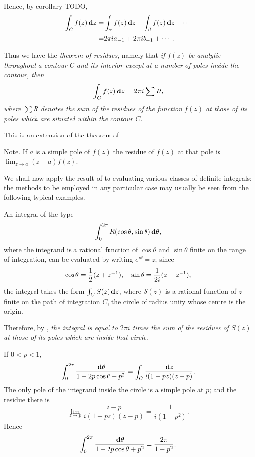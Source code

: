 Hence, by  corollary TODO,
\begin{align*}
  \int_{C} f(z) \, \mathbf{d} z
  =&
  \int_{\alpha} f(z) \, \mathbf{d} z
  + \int_{\beta} f(z) \, \mathbf{d} z
  + \cdots
  \\
  =&
  2\pi i a_{-1} + 2\pi i b_{-1} + \cdots.
\end{align*}

Thus we have the \emph{theorem of residues}, namely that
\emph{if $f(z)$ be analytic throughout a contour $C$ and its interior
  except at a number of poles inside the contour, then
  $$
  \int_{C} f(z) \, \mathbf{d} z = 2\pi i \sum R,
  $$
where $\sum R$ denotes the sum of the residues of the function $f(z)$ at
those of its poles which are situated within the contour $C$.}

This is an extension of the theorem of .

Note. If $a$ is a simple pole of $f(z)$ the residue of $f(z)$ at that pole
is $\lim_{z\rightarrow a} (z-a) f(z)$.


We shall now apply the result of  to evaluating
various classes of definite integrals; the methods to be employed in
any particular case may usually be seen from the following typical
examples.

An integral of the type
$$
\int_{0}^{2\pi} R(\cos \theta, \sin \theta) \dmeasure \theta,\index{Trigonometrical integrals}
$$
where the integrand is a rational function of $\cos\theta$ and
$\sin\theta$ finite on the range of integration, can be evaluated by
writing $e^{i\theta}=z$; since
$$
\cos\theta = \frac{1}{2}(z+z^{-1}),
\quad
\sin\theta = \frac{1}{2i} (z-z^{-1}),
$$
the integral takes the form $\int_{C} S(z) \, \mathbf{d} z$, where $S(z)$
is a rational function of $z$ finite on the path of integration $C$, the
circle of radius unity whose centre is the origin.

Therefore, by , \emph{the integral is equal to
  $2\pi i$ times the sum of the residues of $S(z)$ at those of its
  poles which are inside that circle.}

\begin{wandwexample}
  If $0 < p < 1$,
  $$
  \int_{0}^{2\pi}
  \frac{\, \mathbf{d} \theta}{ 1 - 2p\cos\theta + p^{2}}
  =
  \int_{C} \frac{ \, \mathbf{d} z}{ i (1-pz) (z-p) }.
  $$
  The only pole of the integrand inside the circle is a simple pole at
  $p$; and the residue there is
  $$
  \lim_{z \rightarrow p} \frac{z-p}{ i (1-pz)(z-p)}
  =
  \frac{1}{i (1-p^{2})}.
  $$
  Hence
  $$
  \int_{0}^{2\pi} \frac{\, \mathbf{d}\theta}{1 - 2p\cos\theta + p^{2}}
  =
  \frac{2\pi}{1-p^{2}}.
  $$
\end{wandwexample}

